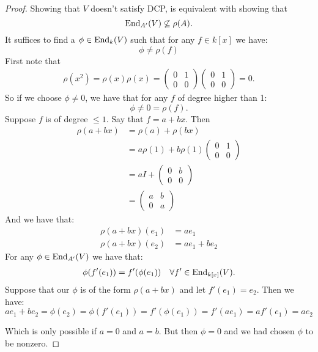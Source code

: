 \begin{proof}
Showing that \(V\) doesn't satisfy DCP, is equivalent with showing that
\[
\operatorname{End}_{A'}(V) \not\subseteq \rho (A).
\]
It suffices to find a \(\phi \in \operatorname{End}_{k}(V)\) such that for any \(f\in k[x]\) we have:
\[
\phi \neq \rho (f)
\]
First note that
\begin{align*}
\rho (x^2)=\rho (x)\rho (x)=\begin{pmatrix}0 & 1 \\ 0 & 0\end{pmatrix}\begin{pmatrix}0 & 1 \\ 0 & 0\end{pmatrix} = 0.
\end{align*}
So if we choose \(\phi \neq 0\), we have that for any \(f\) of degree higher than 1:
\[
\phi  \neq  0 =\rho (f).
\]
Suppose \(f\) is of degree \(\leq 1\). Say that \(f=a+bx\). Then
\begin{align*}
\rho (a+bx)&=\rho (a)+\rho (bx)\\ 
&=a\rho (1)+b\rho (1)\begin{pmatrix}0& 1 \\ 0 & 0\end{pmatrix}  \\
&=aI+\begin{pmatrix}0& b \\ 0 & 0\end{pmatrix}  \ \\
&= \begin{pmatrix}a& b \\ 0 & a\end{pmatrix}
\end{align*}
And we have that:
\begin{align*}
\rho (a+bx)(e_{1})&=ae_{1} \\
\rho (a+bx)(e_{2}) &=ae_{1}+be_{2}
\end{align*}
For any \(\phi \in \operatorname{End}_{A'}(V)\) we have that:
\begin{align*}
\phi (f'(e_{1}))=f'(\phi (e_{1}))&& \forall f'\in \operatorname{End}_{k[x]}(V).
\end{align*}
Suppose that our \(\phi \) is of the form \(\rho (a+bx)\) and let \(f'(e_{1})=e_{2}\). Then we have:
\[
ae_{1}+be_{2}= \phi (e_{2})=\phi (f'(e_{1}))=f'(\phi (e_{1}))=f'(ae_{1})=af'(e_{1})=ae_{2}
\]

Which is only possible if \(a=0\) and \(a=b\). But then \(\phi =0\) and we had chosen \(\phi \) to be nonzero.
\end{proof}

